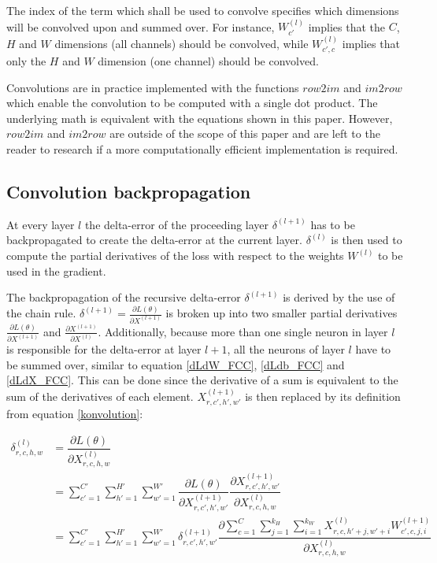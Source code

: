 \documentclass[a4paper, twoside]{article}
\newcommand*{\pd}[2]{\ensuremath{\dfrac{\partial #1}{\partial #2}}}
\newcommand*{\inpd}[2]{\ensuremath{\frac{\partial #1}{\partial #2}}}
\begin{document}
The index of the term which shall be used to convolve specifies which dimensions will be convolved upon and summed over. For instance, $W^{(l)}_{c'}$ implies that the $C$, $H$ and $W$ dimensions (all channels) should be convolved, while $W^{(l)}_{c', c}$ implies that only the $H$ and $W$ dimension (one channel) should be convolved.

Convolutions are in practice implemented with the functions $row2im$ and $im2row$ which enable the convolution to be computed with a single dot product. The underlying math is equivalent with the equations shown in this paper. However, $row2im$ and $im2row$ are outside of the scope of this paper and are left to the reader to research if a more computationally efficient implementation is required. \cite{cs231n} \cite{convmath} \cite{convarithmetic}

\subsection{Convolution backpropagation}
At every layer $l$ the delta-error of the proceeding layer $\delta^{(l+1)}$ has to be backpropagated to create the delta-error at the current layer. $\delta^{(l)}$ is then used to compute the partial derivatives of the loss with respect to the weights $W^{(l)}$ to be used in the gradient. \cite{cs231n} \cite{convmath}
 
The backpropagation of the recursive delta-error $\delta^{(l+1)}$ is derived by the use of the chain rule. $\delta^{(l+1)} = \inpd{L(\theta)}{X^{(l+1)}}$ is broken up into two smaller partial derivatives $\inpd{L(\theta)}{X^{(l+1)}}$ and $\inpd{X^{(l+1)}}{X^{(l)}}$. Additionally, because more than one single neuron in layer $l$ is responsible for the delta-error at layer $l+1$, all the neurons of layer $l$ have to be summed over, similar to equation \eqref{dLdW_FCC}, \eqref{dLdb_FCC} and \eqref{dLdX_FCC}. This can be done since the derivative of a sum is equivalent to the sum of the derivatives of each element. $X^{(l+1)}_{r,c',h',w'}$ is then replaced by its definition from equation \eqref{konvolution}: \cite{convmath} \cite{webconv1} \cite{webconv2} \cite{webconv3}

\begin{equation}\label{konvolutionbackprop}
\begin{split}
	\delta^{(l)}_{r,c,h,w}
		& = \pd{L(\theta)}{X^{(l)}_{r,c,h,w}} \\
		& = \sum^{C' }_{c'=1} \sum^{H' }_{h'=1} \sum^{W' }_{w'=1} \pd{L(\theta)}{X^{(l+1)}_{r,c',h',w'}} \pd{X^{(l+1)}_{r,c',h',w'}}{X^{(l)}_{r,c,h,w}} \\
		& = \sum^{C' }_{c'=1} \sum^{H' }_{h'=1} \sum^{W' }_{w'=1} \delta^{(l+1)}_{r,c',h',w'} \pd{\sum^{C }_{c=1} \sum^{k_H }_{j=1} \sum^{k_W }_{i=1} X^{(l)}_{r, c, h'+j, w'+i}W^{(l+1)}_{c', c, j, i}}{X^{(l)}_{r,c,h,w}}
\end{split}
\end{equation}
\end{document}
